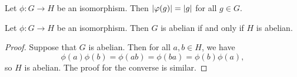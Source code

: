 \begin{theorem}
    Let \(\phi: G \to H\) be an isomorphism. Then \(\lvert \varphi(g) \rvert =
    \lvert g \rvert\) for all \(g \in G\).
\end{theorem}

\begin{theorem}
    Let \(\phi : G \to H\) be an isomorphism. Then \(G\) is abelian if and only
    if \(H\) is abelian.
\end{theorem}

\begin{proof}
    Suppose that \(G\) is abelian. Then for all \(a, b \in H\), we have
    \[
        \phi(a)\phi(b) = \phi(ab) = \phi(ba) = \phi(b)\phi(a),
    \]
    so \(H\) is abelian. The proof for the converse is similar.
\end{proof}

\bigskip

